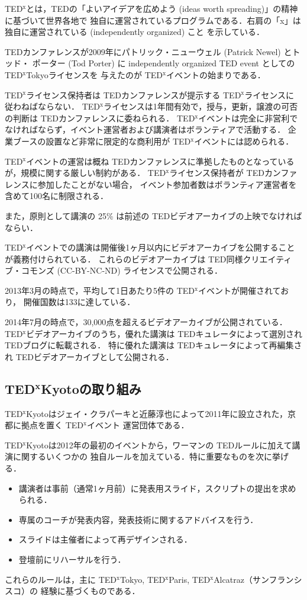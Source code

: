 \documentclass[submit,techreq,jkeyword,noauthor]{ipsj}
\newcommand{\TED}{\textrm{TED}}
\newcommand{\TEDx}{\TED${}^{\textrm{x}}$}
\newcommand{\TEDxTokyo}{\TEDx\textrm{Tokyo}}
\newcommand{\TEDxKyoto}{\TEDx\textrm{Kyoto}}
\newcommand{\TEDxParis}{\TEDx\textrm{Paris}}
\newcommand{\TEDxAlcatraz}{\TEDx\textrm{Alcatraz}}
\newcommand{\TEDtitle}{\textbf{TED}}
\newcommand{\TEDxtitle}{\TEDtitle${}^{\textbf{x}}$}
\newcommand{\TEDxKyototitle}{\TEDxtitle\textbf{Kyoto}}
\begin{document}
\TEDx とは，\TED の「よいアイデアを広めよう (ideas worth spreading)」の精神に基づいて世界各地で
独自に運営されているプログラムである．右肩の「x」は独自に運営されている (independently organized) こと
を示している．

\TED カンファレンスが2009年にパトリック・ニューウェル (Patrick Newel) とトッド・
ポーター (Tod Porter) に independently organized TED event としての \TEDxTokyo ライセンスを
与えたのが \TEDx イベントの始まりである．

\TEDx ライセンス保持者は \TED カンファレンスが提示する \TEDx ライセンス\cite{tedxrules}に
従わねばならない．
\TEDx ライセンスは1年間有効で，授与，更新，譲渡の可否の判断は \TED カンファレンスに委ねられる．
\TEDx イベントは完全に非営利でなければならず，イベント運営者および講演者はボランティアで活動する．
企業ブースの設置など非常に限定的な商利用が \TEDx イベントには認められる．

\TEDx イベントの運営は概ね \TED カンファレンスに準拠したものとなっているが，規模に関する厳しい制約がある．
\TEDx ライセンス保持者が \TED カンファレンスに参加したことがない場合，
イベント参加者数はボランティア運営者を含めて100名に制限される．

また，原則として講演の 25\% は前述の \TED ビデオアーカイブの上映でなければならい．

\TEDx イベントでの講演は開催後1ヶ月以内にビデオアーカイブを公開することが義務付けられている．
これらのビデオアーカイブは \TED 同様クリエイティブ・コモンズ (CC-BY-NC-ND) ライセンスで公開される．

2013年3月の時点で，平均して1日あたり5件の \TEDx イベントが開催されており，
開催国数は133に達している．\cite{nh,mf}

2014年7月の時点で，30,000点を超えるビデオアーカイブが公開されている．
\TEDx ビデオアーカイブのうち，優れた講演は \TED キュレータによって選別され \TED ブログに転載される．
特に優れた講演は \TED キュレータによって再編集され \TED ビデオアーカイブとして公開される．\cite{tedxtalksweb}

\subsection{\TEDxKyototitle の取り組み}

\TEDxKyoto はジェイ・クラパーキと近藤淳也によって2011年に設立された，京都に拠点を置く \TEDx イベント
運営団体である．

\TEDxKyoto は2012年の最初のイベントから，ワーマンの \TED ルールに加えて講演に関するいくつかの
独自ルールを加えている．特に重要なものを次に挙げる．
\begin{itemize}
\item 講演者は事前（通常1ヶ月前）に発表用スライド，スクリプトの提出を求められる．
\item 専属のコーチが発表内容，発表技術に関するアドバイスを行う．
\item スライドは主催者によって再デザインされる．
\item 登壇前にリハーサルを行う．
\end{itemize}
これらのルールは，主に \TEDxTokyo, \TEDxParis, \TEDxAlcatraz  （サンフランシスコ）の
経験に基づくものである．
\end{document}

